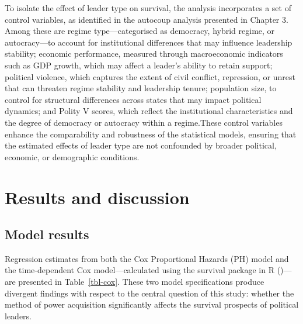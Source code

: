 \documentclass[
  12pt,
]{report}
\begin{document}
To isolate the effect of leader type on survival, the analysis
incorporates a set of control variables, as identified in the autocoup
analysis presented in Chapter 3. Among these are regime
type---categorised as democracy, hybrid regime, or autocracy---to
account for institutional differences that may influence leadership
stability; economic performance, measured through macroeconomic
indicators such as GDP growth, which may affect a leader's ability to
retain support; political violence, which captures the extent of civil
conflict, repression, or unrest that can threaten regime stability and
leadership tenure; population size, to control for structural
differences across states that may impact political dynamics; and Polity
V scores, which reflect the institutional characteristics and the degree
of democracy or autocracy within a regime.These control variables
enhance the comparability and robustness of the statistical models,
ensuring that the estimated effects of leader type are not confounded by
broader political, economic, or demographic conditions.

\section{Results and discussion}\label{results-and-discussion}

\subsection*{Model results}\label{model-results}

Regression estimates from both the Cox Proportional Hazards (PH) model
and the time-dependent Cox model---calculated using the survival package
in R ()---are presented in
Table~\ref{tbl-cox}. These two model specifications produce divergent
findings with respect to the central question of this study: whether the
method of power acquisition significantly affects the survival prospects
of political leaders.
\end{document}
